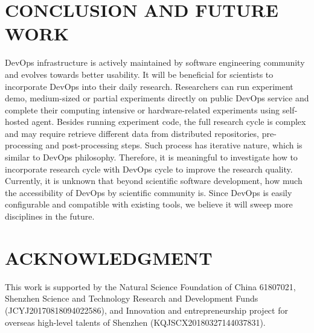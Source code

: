 \documentclass[10pt, conference, compsocconf]{IEEEtran}
\begin{document}
\section{CONCLUSION AND FUTURE WORK}
DevOps infrastructure is actively maintained by software engineering community and evolves towards better usability. It will be beneficial for scientists to incorporate DevOps into their daily research. Researchers can run experiment demo, medium-sized or partial experiments directly on public DevOps service and complete their computing intensive or hardware-related experiments using self-hosted agent. Besides running experiment code, the full research cycle is complex and may require retrieve different data from distributed repositories, pre-processing and post-processing steps. Such process has iterative nature, which is similar to DevOps philosophy. Therefore, it is meaningful to investigate how to incorporate research cycle with DevOps cycle to improve the research quality. Currently, it is unknown that beyond scientific software development, how much the accessibility of DevOps by scientific community is. Since DevOps is easily configurable and compatible with existing tools, we believe it will sweep more disciplines in the future.

\section{ACKNOWLEDGMENT}

This work is supported by the Natural Science Foundation of China 61807021, Shenzhen Science and Technology Research and Development Funds (JCYJ20170818094022586), and Innovation and entrepreneurship project for overseas high-level talents of Shenzhen (KQJSCX20180327144037831).




\end{document}
